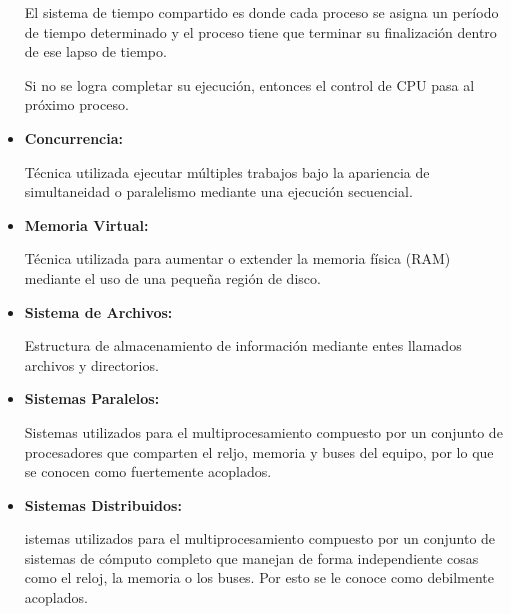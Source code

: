 \documentclass[12pt, fleqn]{report}                             %
\begin{document}
\begin{itemize}
                    El sistema de tiempo compartido es donde cada proceso se asigna un período de
                    tiempo determinado y el proceso tiene que terminar su finalización dentro de ese
                    lapso de tiempo.

                    Si no se logra completar su ejecución, entonces el control de CPU pasa al
                    próximo proceso.

                \item
                    \textbf{Concurrencia: }

                    Técnica utilizada ejecutar múltiples trabajos bajo la apariencia de
                    simultaneidad o paralelismo mediante una ejecución secuencial.

                \item
                    \textbf{Memoria Virtual: }

                    Técnica utilizada para aumentar o extender la memoria física (RAM) mediante
                    el uso de una pequeña región de disco.

                \item
                    \textbf{Sistema de Archivos: }

                    Estructura de almacenamiento de información mediante entes llamados
                    archivos y directorios.

                \item
                    \textbf{Sistemas Paralelos: }

                    Sistemas utilizados para el multiprocesamiento compuesto por un conjunto
                    de procesadores que comparten el reljo, memoria y buses del equipo, por lo
                    que se conocen como fuertemente acoplados.

                \item
                    \textbf{Sistemas Distribuidos: }

                    istemas utilizados para el multiprocesamiento compuesto por un conjunto
                    de sistemas de cómputo completo que manejan de forma independiente cosas
                    como el reloj, la memoria o los buses. Por esto se le conoce como debilmente
                    acoplados.

            \end{itemize}



        \clearpage
\end{document}
